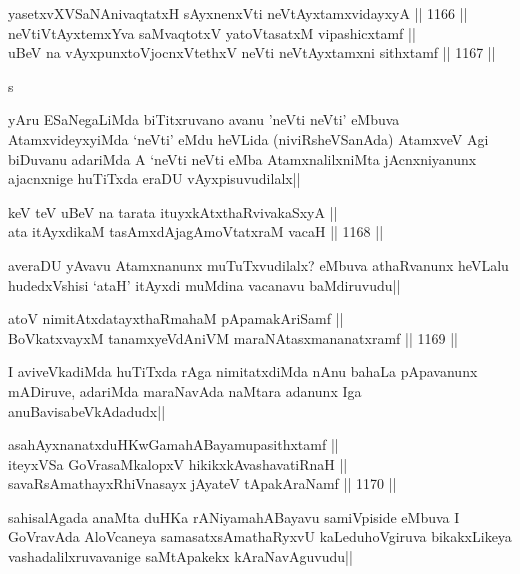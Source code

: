 \begin{shl}
yasetxvXVSaNAnivaqtatxH sAyxnenxVti neVtAyxtamxvidayxyA ||  1166 ||  \\
neVtiVtAyxtemxYva saMvaqtotxV yatoV\s tasatxM vipashicxtamf ||  \\
uBeV na vAyxpunxtoV\s jocnxVtethxV neVti neVtAyxtamxni sithxtamf ||  1167 ||  
\end{shl}s

\begin{artha}
yAru ESaNegaLiMda biTitxruvano avanu 'neVti neVti' eMbuva AtamxvideyxyiMda `neVti' eMdu heVLida (niviRsheVSanAda) AtamxveV Agi biDuvanu adariMda A `neVti neVti eMba AtamxnalilxniMta jAcnxniyanunx ajacnxnige huTiTxda eraDU vAyxpisuvudilalx||
\end{artha}

\begin{shl}
keV teV uBeV na tarata ituyxkAtxthaRvivakaSxyA ||  \\
ata itAyxdikaM tasAmxdAjagAmoVtatxraM vacaH ||  1168 ||  
\end{shl}

\begin{artha}
averaDU yAvavu Atamxnanunx muTuTxvudilalx? eMbuva athaRvanunx heVLalu hudedxVshisi `ataH' itAyxdi muMdina vacanavu baMdiruvudu||
\end{artha}



\begin{shl}
atoV nimitAtxdatayxthaRmahaM pApamakAriSamf || \\
BoVkatxvayxM tanamxyeVdAniVM maraNAtasxmananatxramf ||  1169 ||  
\end{shl}

\begin{artha}
I aviveVkadiMda huTiTxda rAga nimitatxdiMda nAnu bahaLa pApavanunx mADiruve, adariMda maraNavAda naMtara adanunx Iga anuBavisabeVkAdadudx||
\end{artha}

\begin{shl}
asahAyxnanatxduHKwGamahABayamupasithxtamf || \\
iteyxVSa GoVrasaMkalopxV hikikxkAvashavatiRnaH || \\
savaRsAmathayxRhiVnasayx jAyateV tApakAraNamf ||  1170 ||  
\end{shl}

\begin{artha}
sahisalAgada anaMta duHKa rANiyamahABayavu samiVpiside eMbuva I GoVravAda  AloVcaneya samasatxsAmathaRyxvU kaLeduhoVgiruva bikakxLikeya vashadalilxruvavanige saMtApakekx kAraNavAguvudu||
\end{artha}

